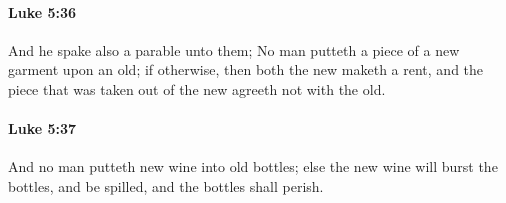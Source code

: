 		\paragraph{Luke 5:36} %
			\label{LUKE-5-36}

			And he spake also a parable unto them; No man putteth a piece of a new garment upon an old; if otherwise, then both the new maketh a rent, and the piece that was taken out of the new agreeth not with the old.

			\begin{framed}
			\scriptsize
				\begin{compactdesc}
					\item[SBLG] 
				\end{compactdesc}
			\end{framed}

		\paragraph{Luke 5:37} %
			\label{LUKE-5-37}

			And no man putteth new wine into old bottles; else the new wine will burst the bottles, and be spilled, and the bottles shall perish.

